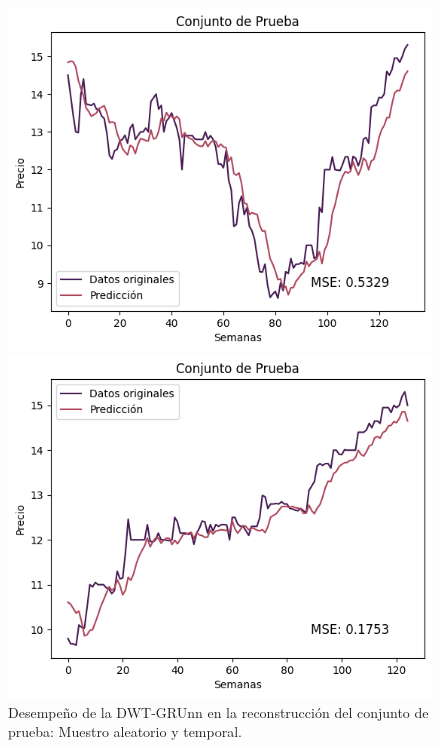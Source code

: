 \begin{figure}[H]
    \begin{minipage}{0.5\textwidth}
        \centering
        \includegraphics[width=\linewidth]{Figuras/proceso_de_entrenamiento/grafs_c_prueba/muestreo_aleatorio/DWT_GRU/estandar/DWT_GRU_rec.png}
    \end{minipage}
    \begin{minipage}{0.5\textwidth}
        \centering
        \includegraphics[width=\linewidth]{Figuras/proceso_de_entrenamiento/grafs_c_prueba/DWT_GRU/estandar/DWT_GRU_rec.png}
    \end{minipage}
    \caption{Desempeño de la DWT-GRUnn en la reconstrucción del conjunto de prueba: Muestro aleatorio y temporal.} 
    \label{fig:c_prueba_DWTGRU}
\end{figure}

